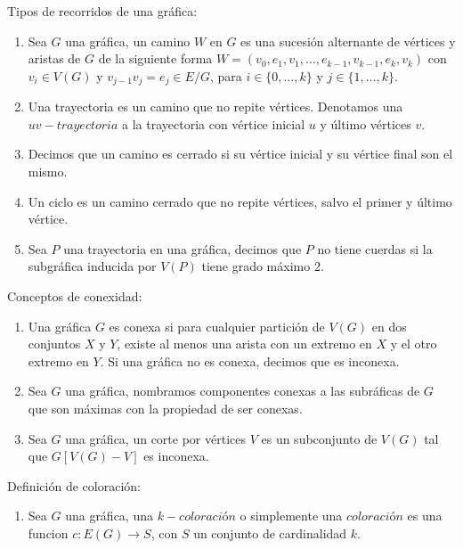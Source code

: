 \begin{definicion} Tipos de recorridos de una gr\'afica:
    \label{def:tipos de recorridos}
    \begin{enumerate}
        \item Sea $G$ una gr\'afica, un camino $W$ en $G$ es una sucesi\'on
        alternante de v\'ertices y aristas de $G$ de la siguiente forma
        $W=(v_0, e_1,v_1, \dots, e_{k-1},v_{k-1}, e_k,v_k)$ con $v_i \in
        V(G)$ y $v_{j-1}v_j = e_j \in E/G$, para $i \in \{0, \dots, k\}$ y
        $j \in \{ 1, \dots, k\}$.
        \item Una trayectoria es un camino que no repite v\'ertices.
        Denotamos una $uv-\textit{trayectoria}$ a la trayectoria con
        v\'ertice inicial $u$ y \'ultimo v\'ertices $v$.
        \item Decimos que un camino es cerrado si su v\'ertice inicial y su
        v\'ertice final son el mismo.
        \item Un ciclo es un camino cerrado que no repite v\'ertices, salvo
        el primer y \'ultimo v\'ertice.
        \item Sea $P$ una trayectoria en una gr\'afica, decimos que $P$ no
        tiene cuerdas si la subgr\'afica inducida por $V(P)$ tiene grado
        m\'aximo 2.
    \end{enumerate}
\end{definicion}

\begin{definicion} Conceptos de conexidad:
    \label{def:conexidad}
    \begin{enumerate}    
        \item Una gr\'afica $G$ es conexa si para cualquier partici\'on de
        $V(G)$ en dos conjuntos $X$ y $Y$, existe al menos una arista con un
        extremo en $X$ y el otro extremo en $Y$. Si una gr\'afica no es
        conexa, decimos que es inconexa.
        \item Sea $G$ una gr\'afica, nombramos componentes conexas a las
        subr\'aficas de $G$ que son m\'aximas con la propiedad de ser
        conexas.
        \item Sea $G$ una gr\'afica, un corte por v\'ertices $V$ es un
        subconjunto de $V(G)$ tal que $G[V(G)-V]$ es inconexa.
    \end{enumerate}
\end{definicion}

\begin{definicion} Definici\'on de coloraci\'on:
    \label{def:coloracion}
    \begin{enumerate}
        \item Sea $G$ una gr\'afica, una $k-\textit{coloraci\'on}$ o simplemente
        una $\textit{coloraci\'on}$ es una funcion $c: E(G)\rightarrow S$, con
        $S$ un conjunto de cardinalidad $k$.
    \end{enumerate}
\end{definicion}

